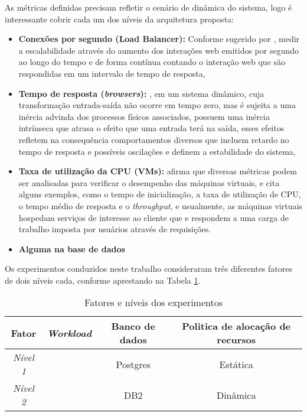 As métricas definidas precisam refletir o cenário de dinâmica do sistema, logo é interessante cobrir cada um dos níveis da arquitetura proposta:
\begin{itemize}
	\item \textbf{Conexões por segundo (Load Balancer):} Conforme sugerido por \cite{Binnig2009}, medir a escalabilidade através do aumento dos interações web emitidos por segundo ao longo do tempo e de forma contínua contando o interação web que são respondidas em um intervalo de tempo de resposta,
	\item \textbf{Tempo de resposta (\textit{browsers}):} \cite{helder2014}, em um sistema dinâmico, cuja transformação entrada-saída não ocorre em tempo zero, mas é sujeita a uma inércia advinda dos processos físicos associados, possuem uma inércia intrínseca que atrasa o efeito que uma entrada terá na saída, esses efeitos refletem na consequência comportamentos diversos que incluem retardo no tempo de resposta e possíveis oscilações e definem a estabilidade do sistema, 
	\item \textbf{Taxa de utilização da CPU (VMs):} \cite{Nobile2013} afirma que diversas métricas podem ser analisadas para verificar o desempenho das máquinas virtuais, e cita alguns exemplos, como o tempo de inicialização, a taxa de utilização de CPU, o tempo médio de resposta e o \textit{throughput}, e usualmente, as máquinas virtuais hospedam serviços de interesse ao cliente que e respondem a uma carga de trabalho imposta por usuários através de requisições.
	\item \textbf{Alguma na base de dados}
\end{itemize}


Os experimentos conduzidos neste trabalho consideraram três diferentes fatores de dois níveis cada, conforme aprestando na Tabela \ref{tab:fatores_niveis}. 

\begin{table}[htb]
	\centering
	\caption{Fatores e níveis dos experimentos}
	\label{tab:fatores_niveis}
	\begin{tabularx}{\textwidth}{|c|c|c|c|} \hline\hline
		\textbf{Fator}		& \textbf{\textit{Workload}} & \textbf{Banco de dados}  & \textbf{Politica de alocação de recursos} \\ \hline
		\textit{Nível 1}	&							 & Postgres					& Estática									\\
		\textit{Nível 2}	&							 & DB2						& Dinâmica									\\		
		\hline
	\end{tabularx}
	\fdadospesquisa
\end{table}

